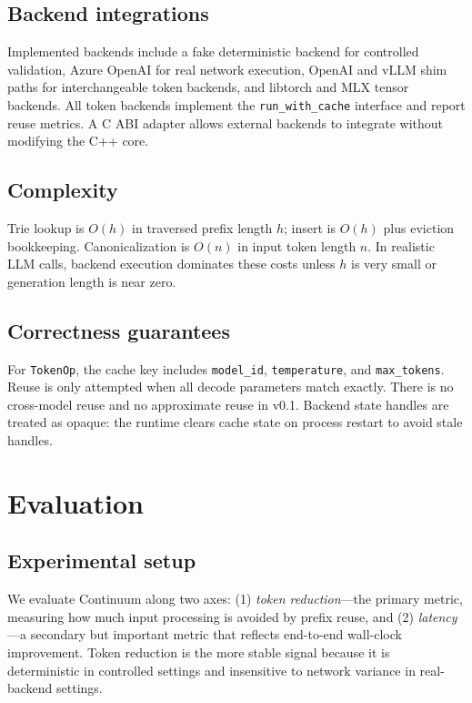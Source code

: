 \documentclass[10pt,twocolumn]{article}
\begin{document}
\subsection{Backend integrations}
Implemented backends include a fake deterministic backend for controlled validation, Azure OpenAI for real network execution, OpenAI and vLLM shim paths for interchangeable token backends, and libtorch and MLX tensor backends. All token backends implement the \texttt{run\_with\_cache} interface and report reuse metrics. A C ABI adapter allows external backends to integrate without modifying the C++ core.

\subsection{Complexity}
Trie lookup is $O(h)$ in traversed prefix length $h$; insert is $O(h)$ plus eviction bookkeeping. Canonicalization is $O(n)$ in input token length $n$. In realistic LLM calls, backend execution dominates these costs unless $h$ is very small or generation length is near zero.

\subsection{Correctness guarantees}
For \texttt{TokenOp}, the cache key includes \texttt{model\_id}, \texttt{temperature}, and \texttt{max\_tokens}. Reuse is only attempted when all decode parameters match exactly. There is no cross-model reuse and no approximate reuse in v0.1. Backend state handles are treated as opaque: the runtime clears cache state on process restart to avoid stale handles.

\section{Evaluation}

\subsection{Experimental setup}
We evaluate Continuum along two axes: (1) \emph{token reduction}---the primary metric, measuring how much input processing is avoided by prefix reuse, and (2) \emph{latency}---a secondary but important metric that reflects end-to-end wall-clock improvement. Token reduction is the more stable signal because it is deterministic in controlled settings and insensitive to network variance in real-backend settings.
\end{document}
